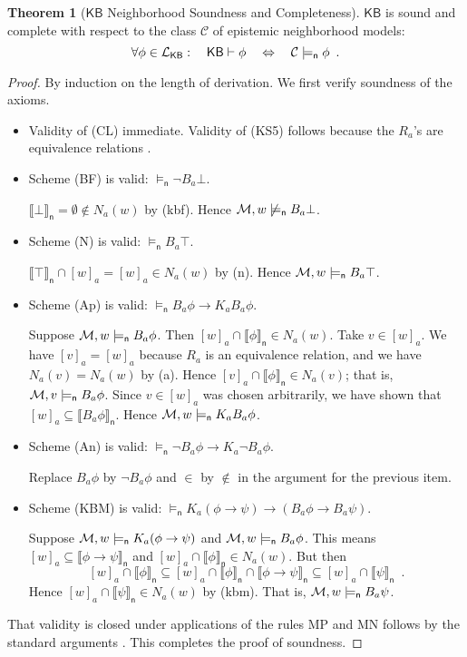 \documentclass[12pt]{article}
\theoremstyle{definition}
\newtheorem{theorem}{Theorem}[section]
\newcommand{\M}{{\cal M}}      %
\newcommand{\Lang}{{\cal L}}   %
\newcommand{\KB}{{\mathsf{KB}}}                        %
\newcommand{\modelsn}{\models_{\mathsf{n}}}                  %
\newcommand{\semn}[1]{\llbracket{#1}\rrbracket_{\mathsf{n}}} %
\begin{document}
\begin{theorem}[$\KB$ Neighborhood Soundness and Completeness]
  \label{theorem:KB-neighborhood-soundness}\label{theorem:KB-neighborhood-completeness}
  $\KB$ is sound and complete with respect to the class $\mathcal{C}$
  of epistemic neighborhood models:
  \[
  \forall\phi\in\Lang_\KB:\quad\KB\vdash\phi
  \quad\Leftrightarrow\quad
  \mathcal{C}\modelsn\phi
  \enspace.
  \]
\end{theorem}
\begin{proof}
  By induction on the length of derivation.  We first
  verify soundness of the axioms.
  \begin{itemize}
  \item Validity of (CL) immediate. Validity of (KS5) follows because
    the $R_a$'s are equivalence relations \cite{BlaRijVen:ml}.

  \item Scheme (BF) is valid: $\modelsn\lnot B_a\bot$.

    $\semn{\bot}=\emptyset\notin N_a(w)$ by (kbf).  Hence
    $\M,w\not\modelsn B_a\bot$.

  \item Scheme (N) is valid: $\modelsn B_a\top$.

    $\semn{\top}\cap[w]_a=[w]_a\in N_a(w)$ by (n).  Hence
    $\M,w\modelsn B_a\top$.

  \item Scheme (Ap) is valid: $\modelsn B_a\phi\to K_a B_a\phi$.

    Suppose $\M,w\modelsn B_a\phi$. Then $[w]_a\cap\semn{\phi}\in
    N_a(w)$.  Take $v\in[w]_a$.  We have $[v]_a=[w]_a$ because $R_a$
    is an equivalence relation, and we have $N_a(v)=N_a(w)$ by (a).
    Hence $[v]_a\cap\semn{\phi}\in N_a(v)$; that is, $\M,v\modelsn
    B_a\phi$.  Since $v\in [w]_a$ was chosen arbitrarily, we have
    shown that $[w]_a\subseteq\semn{B_a\phi}$.  Hence $\M,w\modelsn
    K_a B_a\phi$.

  \item Scheme (An) is valid: $\modelsn \lnot B_a\phi\to K_a\lnot
    B_a\phi$.

    Replace $B_a\phi$ by $\lnot B_a\phi$ and $\in$ by $\notin$ in the
    argument for the previous item.

  \item Scheme (KBM) is valid: $\modelsn
    K_a(\phi\to\psi)\to(B_a\phi\to B_a\psi)$.

    Suppose $\M,w\modelsn K_a(\phi\to\psi)$ and $\M,w\modelsn
    B_a\phi$.  This means $[w]_a\subseteq\semn{\phi\to\psi}$ and
    $[w]_a\cap\semn{\phi}\in N_a(w)$. But then
    \[
    [w]_a\cap\semn{\phi}\subseteq
    [w]_a\cap\semn{\phi}\cap\semn{\phi\to\psi}\subseteq
    [w]_a\cap\semn{\psi}\enspace.
    \]
    Hence $[w]_a\cap\semn{\psi}\in N_a(w)$ by (kbm).  That is,
    $\M,w\modelsn B_a\psi$.
  \end{itemize}
  That validity is closed under applications of the rules MP and MN
  follows by the standard arguments \cite{BlaRijVen:ml}.  This
  completes the proof of soundness.


\end{proof}
\end{document}
